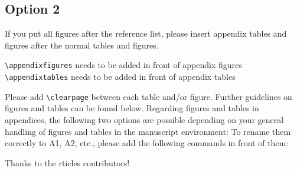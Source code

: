 \documentclass[gc, manuscript]{copernicus}
\begin{document}
\subsection{Option 2}

If you put all figures after the reference list, please insert appendix tables and figures after the normal tables and figures.

\texttt{\textbackslash{}appendixfigures} needs to be added in front of appendix figures
\texttt{\textbackslash{}appendixtables} needs to be added in front of appendix tables

Please add \texttt{\textbackslash{}clearpage} between each table and/or figure. Further guidelines on figures and tables can be found below.
Regarding figures and tables in appendices, the following two options are possible depending on your general handling of figures and tables in the manuscript environment:
To rename them correctly to A1, A2, etc., please add the following commands in front of them:
\noappendix




\begin{acknowledgements}
Thanks to the rticles contributors!
\end{acknowledgements}







\end{document}
